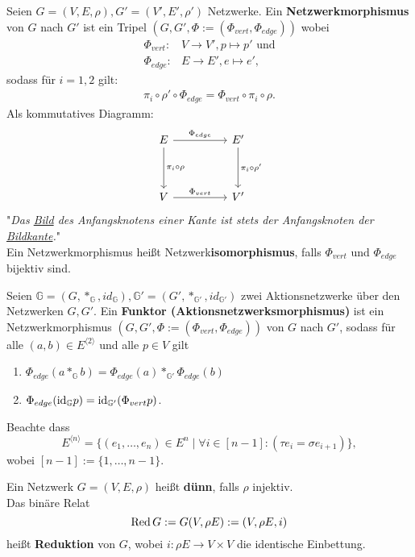 \begin{definition}
    Seien $G = (V,E, \rho), G'= (V', E', \rho')$ Netzwerke.
    Ein \textbf{Netzwerkmorphismus} von $G$ nach $G'$ ist ein Tripel $(G, G', \Phi := (\Phi_{vert}, \Phi_{edge}))$  wobei
    \begin{align*}
        \Phi_{vert}:& V \to V', p \mapsto p' \text{ und}\\
        \Phi_{edge}:& E \to E', e \mapsto e',
    \end{align*}
    sodass für $i=1,2$ gilt:
    \begin{align*}
        \pi_i \circ \rho' \circ \Phi_{edge} = \Phi_{vert} \circ \pi_i \circ \rho.
    \end{align*}
    Als kommutatives Diagramm:
    $$\begin{tikzcd}[column sep=huge, row sep=huge]
        E \dar{\pi_i \circ \rho} \rar{\Phi_{edge}} & E' \dar{\pi_i \circ \rho'}\\
        V \rar{\Phi_{vert}} & V' 
    \end{tikzcd}$$
    "\textit{Das \underline{Bild} des Anfangsknotens einer Kante ist stets der Anfangsknoten der \underline{Bildkante}.}"\\
    Ein Netzwerkmorphismus heißt Netzwerk\textbf{isomorphismus}, falls $\Phi_{vert}$ und $\Phi_{edge}$ bijektiv sind.
\end{definition}

\begin{definition}
    Seien $\mathbb{G} = (G, \ast_\mathbb{G}, id_\mathbb{G}), \mathbb{G}' = (G', \ast_{\mathbb{G}'}, id_{\mathbb{G}'})$
    zwei Aktionsnetzwerke über den Netzwerken $G,G'$.
    Ein \textbf{Funktor (Aktionsnetzwerksmorphismus)} ist ein Netzwerkmorphismus $(G, G', \Phi := (\Phi_{vert}, \Phi_{edge}))$ von $G$ nach $G'$, 
    sodass für alle $(a,b) \in E^{\langle 2 \rangle}$ und alle $p \in V$ gilt
    \begin{enumerate}[label=(M\arabic*)]
        \item $\Phi_{edge}(a \ast_{\mathbb{G}} b) = \Phi_{edge}(a) \ast_{\mathbb{G}'} \Phi_{edge}(b)$
        \item $\Phi_{edge}(\text{id}_\mathbb{G} p) = \text{id}_{\mathbb{G}'}(\Phi_{vert} p)$.
    \end{enumerate}
    Beachte dass
    $$ E^{\langle n \rangle} = \{(e_1,\ldots,e_n) \in E^n \mid \forall i \in [n-1]: ( \tau e_i = \sigma e_{i+1})\}, $$
    wobei $[n-1] := \{1, \ldots, n-1\}$.
\end{definition}

\begin{definition}
    Ein Netzwerk $G=(V,E,\rho)$ heißt \textbf{dünn}, 
    falls $\rho$ injektiv.\\
    Das binäre Relat
    $$ \operatorname{Red} G := G(V, \rho E) := (V, \rho E, i)$$
    heißt \textbf{Reduktion} von $G$, wobei
    $i: \rho E \to V \times V$ die identische Einbettung.
\end{definition}

